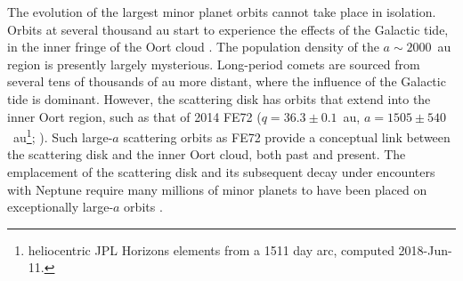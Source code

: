\documentclass{aastex62}
\begin{document}
The evolution of the largest minor planet orbits cannot take place in isolation. 
Orbits at several thousand au start to experience the effects of the Galactic tide, in the inner fringe of the Oort cloud \citep{dones04}.
The population density of the $a \sim 2000$~au region is presently largely mysterious. 
Long-period comets are sourced from several tens of thousands of au more distant, where the influence of the Galactic tide is dominant.
However, the scattering disk has orbits that extend into the inner Oort region, such as that of 2014 FE72 ($q = 36.3\pm 0.1$~au, $a=1505\pm 540$~au\footnote{heliocentric JPL Horizons elements from a 1511 day arc, computed 2018-Jun-11.}; \citealt{sheppardtrujillo16}).
Such large-$a$ scattering orbits as FE72 provide a conceptual link between the scattering disk and the inner Oort cloud, both past and present.
The emplacement of the scattering disk and its subsequent decay under encounters with Neptune require many millions of minor planets to have been placed on exceptionally large-$a$ orbits \citep{gladman05, levison06}.
\end{document}
